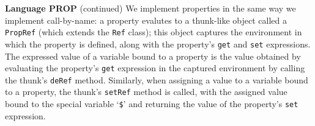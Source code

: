 \begin{minipage}[t]{\sw}
\slidenumber
\LARGE
{\bf Language PROP} (continued)\exx
We implement properties in the same way we implement call-by-name:
a property evalutes to a thunk-like object
called a \verb'PropRef' (which extends the \verb'Ref' class);
this object captures the environment in which the property is defined,
along with the property's \verb'get' and \verb'set' expressions.\exx
The expressed value of a variable bound to a property
is the value obtained by evaluating the property's \verb'get' expression
in the captured environment by calling the thunk's \verb'deRef' method.\exx
Similarly, when assigning a value to a variable bound to a property,
the thunk's \verb'setRef' method is called,
with the assigned value bound to the special variable `\verb'$''
and returning the value of the property's \verb'set' expression.\exx
\end{minipage}
